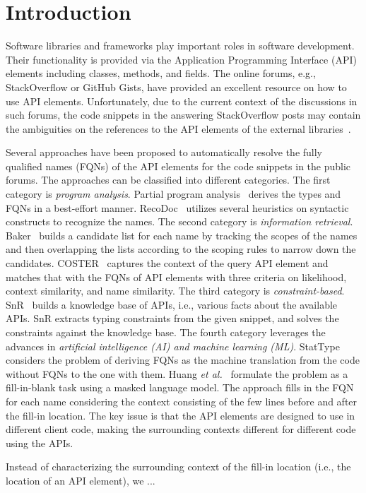 \section{Introduction}
\label{sec:intro}

Software libraries and frameworks play important roles in software
development. Their functionality is provided via the Application
Programming Interface (API) elements including classes, methods, and
fields. The online forums, e.g., StackOverflow or GitHub Gists, have
provided an excellent resource on how to use API
elements. Unfortunately, due to the current context of the discussions
in such forums, the code snippets in the answering StackOverflow posts
may contain the ambiguities on the references to the API elements of
the external libraries~\cite{liveapi14}.

Several approaches have been proposed to automatically resolve the
fully qualified names (FQNs) of the API elements for the code snippets
in the public forums.  The approaches can be classified into different
categories. The first category is {\em program analysis}. Partial
program analysis~\cite{dagenais-oopsla08} derives the types and FQNs
in a best-effort manner. RecoDoc~\cite{dagenais-icse12} utilizes
several heuristics on syntactic constructs to recognize the names.
The second category is {\em information
  retrieval}. Baker~\cite{liveapi14} builds a candidate list for each
name by tracking the scopes of the names and then overlapping the
lists according to the scoping rules to narrow down the candidates.
COSTER~\cite{coster-ase19} captures the context of the query API
element and matches that with the FQNs of API elements with three
criteria on likelihood, context similarity, and name similarity.  The
third category is {\em constraint-based}.  SnR~\cite{snr-icse22}
builds a knowledge base of APIs, i.e., various facts about the
available APIs.  SnR extracts typing constraints from the given
snippet, and solves the constraints against the knowledge base. The
fourth category leverages the advances in {\em artificial intelligence
  (AI) and machine learning (ML)}. StatType considers the problem of
deriving FQNs as the machine translation from the code without FQNs to
the one with them. Huang {\em et al.}~\cite{prompt-ase22} formulate
the problem as a fill-in-blank task using a masked language model. The
approach fills in the FQN for each name considering the context
consisting of the few lines before and after the fill-in location.
The key issue is that the API elements are designed to use in
different client code, making the surrounding contexts different for
different code using the APIs.

Instead of characterizing the surrounding context
of the fill-in location (i.e., the location of an API element),
we ...
